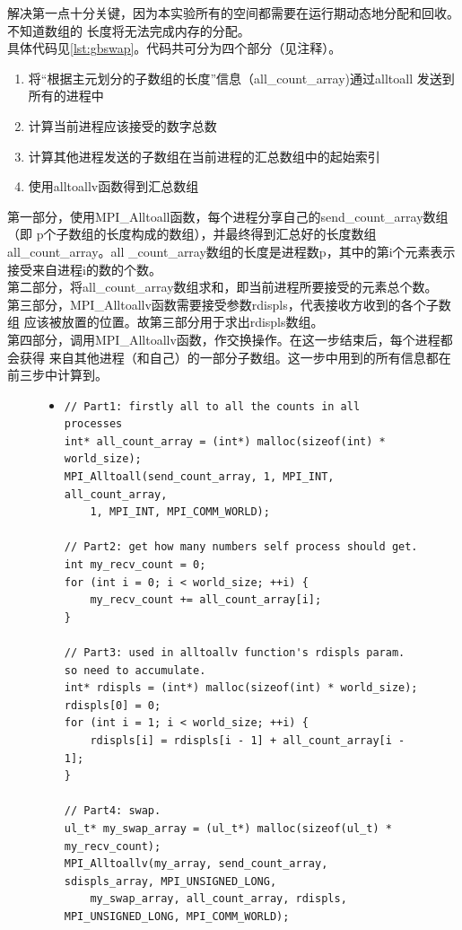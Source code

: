 \documentclass[a4paper]{article}
\begin{document}
解决第一点十分关键，因为本实验所有的空间都需要在运行期动态地分配和回收。不知道数组的
长度将无法完成内存的分配。\\

具体代码见\autoref{lst:gbswap}。代码共可分为四个部分（见注释）。
\begin{enumerate}
    \item 将``根据主元划分的子数组的长度''信息（all\_count\_array)通过alltoall
    发送到所有的进程中
    \item 计算当前进程应该接受的数字总数
    \item 计算其他进程发送的子数组在当前进程的汇总数组中的起始索引
    \item 使用alltoallv函数得到汇总数组
\end{enumerate}
第一部分，使用MPI\_Alltoall函数，每个进程分享自己的send\_count\_array数组（即
p个子数组的长度构成的数组），并最终得到汇总好的长度数组all\_count\_array。all
\_count\_array数组的长度是进程数p，其中的第i个元素表示接受来自进程i的数的个数。\\

第二部分，将all\_count\_array数组求和，即当前进程所要接受的元素总个数。\\

第三部分，MPI\_Alltoallv函数需要接受参数rdispls，代表接收方收到的各个子数组
应该被放置的位置。故第三部分用于求出rdispls数组。\\

第四部分，调用MPI\_Alltoallv函数，作交换操作。在这一步结束后，每个进程都会获得
来自其他进程（和自己）的一部分子数组。这一步中用到的所有信息都在前三步中计算到。
\begin{figure}[!hbt]
\begin{itemize}
\item[] \begin{lstlisting}[style=mycpp, label=lst:gbswap, caption=全局交换关键代码]
// Part1: firstly all to all the counts in all processes
int* all_count_array = (int*) malloc(sizeof(int) * world_size);
MPI_Alltoall(send_count_array, 1, MPI_INT, all_count_array,
    1, MPI_INT, MPI_COMM_WORLD);

// Part2: get how many numbers self process should get.
int my_recv_count = 0;
for (int i = 0; i < world_size; ++i) {
    my_recv_count += all_count_array[i];
}

// Part3: used in alltoallv function's rdispls param. so need to accumulate.
int* rdispls = (int*) malloc(sizeof(int) * world_size);
rdispls[0] = 0;
for (int i = 1; i < world_size; ++i) {
    rdispls[i] = rdispls[i - 1] + all_count_array[i - 1];
}

// Part4: swap.
ul_t* my_swap_array = (ul_t*) malloc(sizeof(ul_t) * my_recv_count);
MPI_Alltoallv(my_array, send_count_array, sdispls_array, MPI_UNSIGNED_LONG,
    my_swap_array, all_count_array, rdispls, MPI_UNSIGNED_LONG, MPI_COMM_WORLD);

\end{lstlisting}
\end{itemize}
\end{figure}
\end{document}
